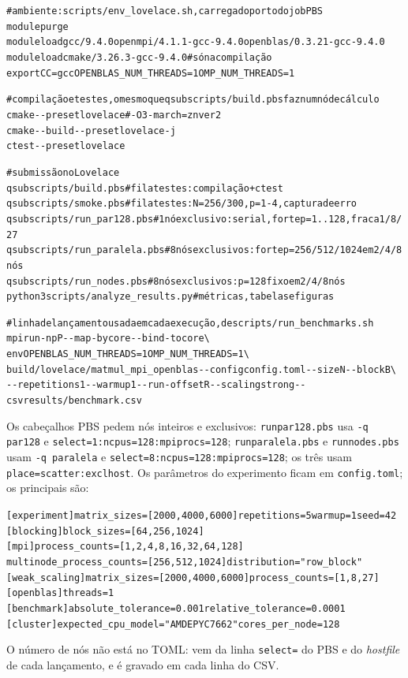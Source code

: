 \documentclass[Portugues]{ic-tese-v3}
\newcommand{\dd}{-{}-} %
\DeclareRobustCommand{\_}{\textunderscore\allowbreak} %
\begin{document}
{\footnotesize
\begin{alltt}
# ambiente: scripts/env_lovelace.sh, carregado por todo job PBS
module purge
module load gcc/9.4.0 openmpi/4.1.1-gcc-9.4.0 openblas/0.3.21-gcc-9.4.0
module load cmake/3.26.3-gcc-9.4.0              # só na compilação
export CC=gcc OPENBLAS_NUM_THREADS=1 OMP_NUM_THREADS=1

# compilação e testes, o mesmo que qsub scripts/build.pbs faz num nó de cálculo
cmake \dd{}preset lovelace                        # -O3 -march=znver2
cmake \dd{}build \dd{}preset lovelace -j
ctest \dd{}preset lovelace

# submissão no Lovelace
qsub scripts/build.pbs          # fila testes: compilação + ctest
qsub scripts/smoke.pbs          # fila testes: N = 256/300, p = 1-4, captura de erro
qsub scripts/run_par128.pbs     # 1 nó exclusivo: serial, forte p = 1..128, fraca 1/8/27
qsub scripts/run_paralela.pbs   # 8 nós exclusivos: forte p = 256/512/1024 em 2/4/8 nós
qsub scripts/run_nodes.pbs      # 8 nós exclusivos: p = 128 fixo em 2/4/8 nós
python3 scripts/analyze_results.py               # métricas, tabelas e figuras

# linha de lançamento usada em cada execução, de scripts/run_benchmarks.sh
mpirun -np P \dd{}map-by core \dd{}bind-to core \textbackslash
    env OPENBLAS_NUM_THREADS=1 OMP_NUM_THREADS=1 \textbackslash
    build/lovelace/matmul_mpi_openblas \dd{}config config.toml \dd{}size N \dd{}block B \textbackslash
    \dd{}repetitions 1 \dd{}warmup 1 \dd{}run-offset R \dd{}scaling strong \dd{}csv results/benchmark.csv
\end{alltt}}

Os cabeçalhos PBS pedem nós inteiros e exclusivos: \texttt{run\_par128.pbs} usa \texttt{-q par128} e \texttt{select=1:ncpus=128:mpiprocs=128}; \texttt{run\_paralela.pbs} e \texttt{run\_nodes.pbs} usam \texttt{-q paralela} e \texttt{select=8:ncpus=128:mpiprocs=128}; os três usam \texttt{place=scatter:exclhost}. Os parâmetros do experimento ficam em \texttt{config.toml}; os principais são:

{\footnotesize
\begin{alltt}
[experiment]   matrix_sizes = [2000, 4000, 6000]   repetitions = 5   warmup = 1   seed = 42
[blocking]     block_sizes = [64, 256, 1024]
[mpi]          process_counts = [1, 2, 4, 8, 16, 32, 64, 128]
               multinode_process_counts = [256, 512, 1024]   distribution = "row_block"
[weak_scaling] matrix_sizes = [2000, 4000, 6000]   process_counts = [1, 8, 27]
[openblas]     threads = 1
[benchmark]    absolute_tolerance = 0.001   relative_tolerance = 0.0001
[cluster]      expected_cpu_model = "AMD EPYC 7662"   cores_per_node = 128
\end{alltt}}

O número de nós não está no TOML: vem da linha \texttt{select=} do PBS e do \emph{hostfile} de cada lançamento, e é gravado em cada linha do CSV.
\end{document}
